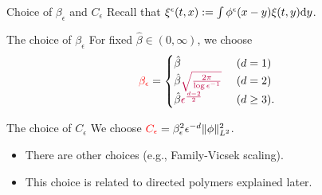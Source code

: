 \documentclass[10pt]{beamer}
\newcommand{\e}{\epsilon}
\begin{document}
\begin{frame}{Choice of $\beta_{\epsilon}$ and $C_{\epsilon}$}
 Recall that $\xi^{\e} (t,x):= \int \phi^\e(x-y) \xi(t,y) {\rm d} y$.
    \begin{block}{The choice of $\beta_{\epsilon}$}
    For fixed $\hat{\beta}\in(0,\infty)$, we choose
    $$
     {\color{red} \beta_{\epsilon}}=\begin{cases}
      \hat{\beta}& \text{  ($d=1$)} \\
      \hat{\beta}{\color{purple}\sqrt{\frac{2\pi}{\log \e^{-1}}}}& \text{  ($d=2$)} \\
            \hat{\beta}{\color{purple} \e^{\frac{d-2}{2}}}& \text{  ($d\geq 3$)} .
      \end{cases}
      $$
    \end{block}
    \vspace{1mm}
       \begin{block}{The choice of $C_{\epsilon}$}
 We choose ${\color{red}C_{\epsilon}}=\beta_{\epsilon}^2 \e^{-d} \|\phi\|_{L^2}^2$.
       \end{block}
       \pause
       \begin{itemize}
       \item There are other choices (e.g., Family-Vicsek scaling).
         \item This choice is related to directed polymers explained later.
         \end{itemize}
\end{frame}
\end{document}
